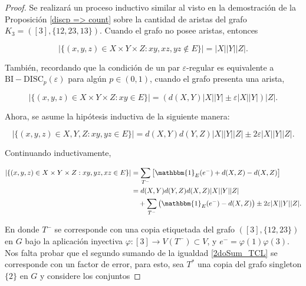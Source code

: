 \documentclass{article}[14pts]
\newcommand{\bidisc}{\mathrm{BI-DISC}}
\let\varepsilon=\varepsilon
\begin{document}
\begin{proof}
    Se realizará un proceso inductivo similar al visto en la demostración de la Proposición \ref{discp => count} sobre la cantidad de aristas del grafo $K_3 = ([3], \lbrace 12, 23, 13\rbrace)$. Cuando el grafo no posee aristas, entonces\medskip
    
    \begin{equation*}
        |\lbrace (x,y,z)\in X\times Y\times Z : xy,xz,yz\not\in E\rbrace| = |X||Y||Z|.
    \end{equation*}\medskip

    También, recordando que la condición de un par $\varepsilon$-regular es equivalente a $\bidisc_p (\varepsilon)$ para algún $p\in(0,1)$, cuando el grafo presenta una arista,\medskip
    
    \begin{equation*}
        |\lbrace (x,y,z)\in X\times Y\times Z : xy\in E\rbrace| = \left( d(X,Y)|X||Y| \pm \varepsilon|X||Y| \right)|Z|.
    \end{equation*}\medskip

    Ahora, se asume la hipótesis inductiva de la siguiente manera:\medskip
    
    \begin{equation*}
        |\lbrace (x,y,z)\in X,Y,Z : xy,yz\in E\rbrace| = d(X,Y)d(Y,Z)|X||Y||Z| \pm 2\varepsilon |X||Y||Z|.
    \end{equation*}\medskip

    Continuando inductivamente,\medskip
    
    \begin{align} \label{2doSum_TCL}
        |\lbrace (x,y,z)\in X\times Y\times Z : xy,yz,xz\in E\rbrace| &= \sum_{T^{-}} \left[ \mathbbm{1}_{E}(e^{-}) + d(X,Z) - d(X,Z) \right]\nonumber \\
        &= d(X,Y)d(Y,Z)d(X,Z)|X||Y||Z| \nonumber\\
        &\ \ \ + \sum_{T^{-}} \left( \mathbbm{1}_{E}(e^{-}) - d(X,Z)\right) \pm 2\varepsilon |X||Y||Z|.
    \end{align}\medskip

    En donde $T^{-}$ se corresponde con una copia etiquetada del grafo $([3], \lbrace 12, 23\rbrace)$ en $G$ bajo la aplicación inyectiva $\varphi : [3]\to V(T^{-})\subset V$, y $e^{-} = \varphi(1)\varphi(3)$. Nos falta probar que el segundo sumando de la igualdad \eqref{2doSum_TCL} se corresponde con un factor de error, para esto, sea $T^{*}$ una copia del grafo singleton $\lbrace 2\rbrace$ en $G$ y considere los conjuntos\medskip
    

\end{proof}
\end{document}
